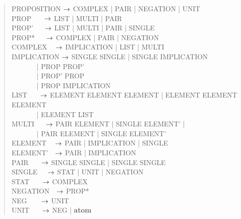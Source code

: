 \documentclass[a4]{article}
\begin{document}
\begin{quote}
\ttfamily
PROPOSITION $\rightarrow$ COMPLEX | PAIR | NEGATION | UNIT\\
PROP \(~~~~~~~\)$\rightarrow$ LIST | MULTI | PAIR\\
PROP' \(~~~~~~\)$\rightarrow$ LIST | MULTI | PAIR | SINGLE\\
PROP* \(~~~~~~\)$\rightarrow$ COMPLEX | PAIR | NEGATION\\
COMPLEX \(~~~~\)$\rightarrow$ IMPLICATION | LIST | MULTI\\
IMPLICATION $\rightarrow$ SINGLE  SINGLE
                    | SINGLE  IMPLICATION\\
\(~~~~~~~~~~~~~~~\) |
 PROP PROP'\\
\(~~~~~~~~~~~~~~~\) |
 PROP'  PROP\\
\(~~~~~~~~~~~~~~~\) |
 PROP  
IMPLICATION\\
LIST \(~~~~~~~\)$\rightarrow$ ELEMENT\txt{, } ELEMENT ELEMENT |
                      ELEMENT\txt{, } ELEMENT ELEMENT\\
\(~~~~~~~~~~~~~~~\) | ELEMENT\txt{, } LIST\\
MULTI \(~~~~~~\)$\rightarrow$ PAIR \: ELEMENT |
                      SINGLE  ELEMENT' |\\
\(~~~~~~~~~~~~~~~\) | PAIR  ELEMENT  |
                      SINGLE  ELEMENT'\\
ELEMENT \(~~~~\)$\rightarrow$ PAIR | IMPLICATION | SINGLE\\
ELEMENT' \(~~~\)$\rightarrow$ PAIR | IMPLICATION\\
PAIR \(~~~~~~~\)$\rightarrow$ SINGLE   SINGLE | SINGLE  SINGLE\\
SINGLE \(~~~~~\)$\rightarrow$ STAT | UNIT | NEGATION\\
STAT \(~~~~~~~\)$\rightarrow$ COMPLEX\\
NEGATION \(~~~\)$\rightarrow$ PROP*\\
NEG \(~~~~~~~~\)$\rightarrow$ UNIT\\
UNIT \(~~~~~~~\)$\rightarrow$ NEG | {\bf atom}\\
\end{quote}
\end{document}
